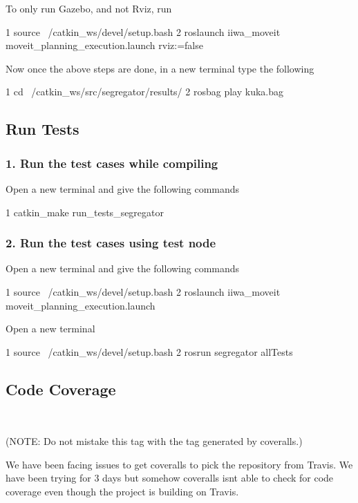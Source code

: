 To only run Gazebo, and not Rviz, run 
\begin{DoxyCode}
1 source ~/catkin\_ws/devel/setup.bash
2 roslaunch iiwa\_moveit moveit\_planning\_execution.launch rviz:=false
\end{DoxyCode}


Now once the above steps are done, in a new terminal type the following 
\begin{DoxyCode}
1 cd ~/catkin\_ws/src/segregator/results/
2 rosbag play kuka.bag
\end{DoxyCode}


\subsection*{Run Tests}

\subsubsection*{1. Run the test cases while compiling}

Open a new terminal and give the following commands 
\begin{DoxyCode}
1 catkin\_make run\_tests\_segregator
\end{DoxyCode}


\subsubsection*{2. Run the test cases using test node}

Open a new terminal and give the following commands 
\begin{DoxyCode}
1 source ~/catkin\_ws/devel/setup.bash
2 roslaunch iiwa\_moveit moveit\_planning\_execution.launch
\end{DoxyCode}
 Open a new terminal 
\begin{DoxyCode}
1 source ~/catkin\_ws/devel/setup.bash
2 rosrun segregator allTests
\end{DoxyCode}


\subsection*{Code Coverage}

 ~\newline


(N\+O\+TE\+: Do not mistake this tag with the tag generated by coveralls.)

We have been facing issues to get coveralls to pick the repository from Travis. We have been trying for 3 days but somehow coveralls isn\textquotesingle{}t able to check for code coverage even though the project is building on Travis.

